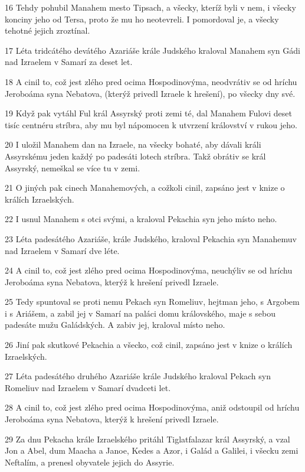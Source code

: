 \par 16 Tehdy pohubil Manahem mesto Tipsach, a všecky, kteríž byli v nem, i všecky konciny jeho od Tersa, proto že mu ho neotevreli. I pomordoval je, a všecky tehotné jejich zroztínal.
\par 17 Léta tridcátého devátého Azariáše krále Judského kraloval Manahem syn Gádi nad Izraelem v Samarí za deset let.
\par 18 A cinil to, což jest zlého pred ocima Hospodinovýma, neodvrátiv se od hríchu Jeroboáma syna Nebatova, (kterýž privedl Izraele k hrešení), po všecky dny své.
\par 19 Když pak vytáhl Ful král Assyrský proti zemi té, dal Manahem Fulovi deset tisíc centnéru stríbra, aby mu byl nápomocen k utvrzení království v rukou jeho.
\par 20 I uložil Manahem dan na Izraele, na všecky bohaté, aby dávali králi Assyrskému jeden každý po padesáti lotech stríbra. Takž obrátiv se král Assyrský, nemeškal se více tu v zemi.
\par 21 O jiných pak cinech Manahemových, a cožkoli cinil, zapsáno jest v knize o králích Izraelských.
\par 22 I usnul Manahem s otci svými, a kraloval Pekachia syn jeho místo neho.
\par 23 Léta padesátého Azariáše, krále Judského, kraloval Pekachia syn Manahemuv nad Izraelem v Samarí dve léte.
\par 24 A cinil to, což jest zlého pred ocima Hospodinovýma, neuchýliv se od hríchu Jeroboáma syna Nebatova, kterýž k hrešení privedl Izraele.
\par 25 Tedy spuntoval se proti nemu Pekach syn Romeliuv, hejtman jeho, s Argobem i s Ariášem, a zabil jej v Samarí na paláci domu královského, maje s sebou padesáte mužu Galádských. A zabiv jej, kraloval místo neho.
\par 26 Jiní pak skutkové Pekachia a všecko, což cinil, zapsáno jest v knize o králích Izraelských.
\par 27 Léta padesátého druhého Azariáše krále Judského kraloval Pekach syn Romeliuv nad Izraelem v Samarí dvadceti let.
\par 28 A cinil to, což jest zlého pred ocima Hospodinovýma, aniž odstoupil od hríchu Jeroboáma syna Nebatova, kterýž k hrešení privedl Izraele.
\par 29 Za dnu Pekacha krále Izraelského pritáhl Tiglatfalazar král Assyrský, a vzal Jon a Abel, dum Maacha a Janoe, Kedes a Azor, i Galád a Galilei, i všecku zemi Neftalím, a prenesl obyvatele jejich do Assyrie.
